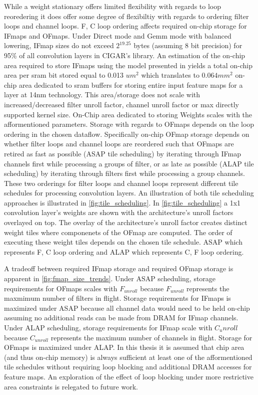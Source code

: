 While a weight stationary offers limited flexibility with regards to loop
reoredering it does offer some degree of flexibiltiy with regards to ordering
filter loops and channel loops. F, C loop ordering affects required on-chip
storage for IFmaps and OFmaps.
Under Direct mode and Gemm mode with balanced lowering, IFmap sizes
do not exceed $2^{19.25}$ bytes (assuming 8 bit precision) for 95\% of all
convolution layers in CIGAR's library. An estimation of the
on-chip area required to store IFmaps using the model presented in
\cite{area_model} yields a total on-chip area per sram bit stored equal to 0.013
$um^2$ which translates to $0.064 mm^2$ on-chip area dedicated to sram buffers
for storing entire input feature maps for a layer at 14nm technology.
This area/storage does not scale with increased/decreased filter unroll factor,
channel unroll factor or max directly supported kernel size. On-Chip area
dedicated to storing Weights scales with the afformentioned parameters.
Storage with regards to OFmaps depends on the loop ordering in the chosen
dataflow. Specifically on-chip OFmap storage depends on whether filter loops and
channel loops are reordered such that OFmaps are retired as fast as possible
(ASAP tile scheduling) by iterating through IFmap channels first while
processing a groups of filter, or as late as possible (ALAP tile scheduling) by
iterating through filters first while processing a group channels. These two
orderings for filter loops and channel loops represent different tile schedules
for processing convolution layers. An illustration of both tile scheduling
approaches is illustrated in \autoref{fig:tile_scheduling}. In
\autoref{fig:tile_scheduling} a 1x1 convolution layer's weights are shown with
the architecture's unroll factors overlayed on top. The overlay of the
architecture's unroll factor creates distinct weight tiles where componenets of
the OFmap are computed. The order of executing these weight tiles depends on the
chosen tile schedule. ASAP which represents F, C loop ordering and ALAP which
represents C, F loop ordering. 

A tradeoff between required IFmap storage and required OFmap storage is apparent
in \autoref{fig:fmap_size_trends}. Under ASAP scheduling, storage requirements for
OFmaps scales with $F_{unroll}$ because $F_{unroll}$ represents the maxmimum
number of filters in flight. Storage requirements for IFmaps is maximized under
ASAP because all channel data would need to be held on-chip assuming no
additional reads can be made from DRAM for IFmap channels. Under ALAP
scheduling, storage requirements for IFmap scale with $C_unroll$ because
$C_{unroll}$ represents the maximum number of channels in flight. Storage for
OFmaps is maximized under ALAP. In this thesis it is assumed that chip
area (and thus on-chip memory) is always sufficient at least one of the
afformentioned tile schedules without requiring loop blocking and additional
DRAM accesses for feature maps. An exploration of the effect of loop blocking
under more restrictive area constraints is relegated to future work. 

